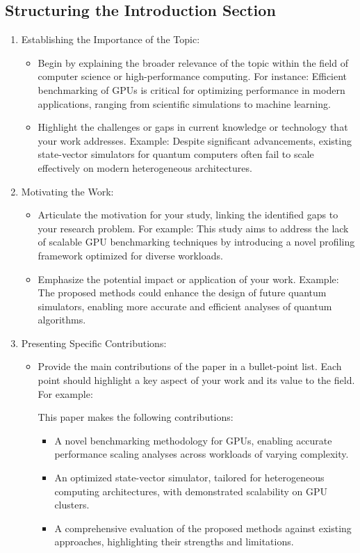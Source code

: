 \documentclass[conference]{IEEEtran}
\begin{document}
\subsection{Structuring the Introduction Section}
\begin{enumerate}
\item Establishing the Importance of the Topic:  
\begin{itemize}
   \item Begin by explaining the broader relevance of the topic within the field of computer science or high-performance computing. For instance: Efficient benchmarking of GPUs is critical for optimizing performance in modern applications, ranging from scientific simulations to machine learning.  
   \item Highlight the challenges or gaps in current knowledge or technology that your work addresses. Example: Despite significant advancements, existing state-vector simulators for quantum computers often fail to scale effectively on modern heterogeneous architectures.
\end{itemize}
\item Motivating the Work:  
\begin{itemize}
   \item Articulate the motivation for your study, linking the identified gaps to your research problem. For example: This study aims to address the lack of scalable GPU benchmarking techniques by introducing a novel profiling framework optimized for diverse workloads.  
   \item Emphasize the potential impact or application of your work. Example: The proposed methods could enhance the design of future quantum simulators, enabling more accurate and efficient analyses of quantum algorithms.  
\end{itemize}
\item Presenting Specific Contributions:  
\begin{itemize}
   \item Provide the main contributions of the paper in a bullet-point list. Each point should highlight a key aspect of your work and its value to the field. For example:  

     This paper makes the following contributions:
\begin{itemize}
     \item A novel benchmarking methodology for GPUs, enabling accurate performance scaling analyses across workloads of varying complexity.  
     \item An optimized state-vector simulator, tailored for heterogeneous computing architectures, with demonstrated scalability on GPU clusters.  
     \item A comprehensive evaluation of the proposed methods against existing approaches, highlighting their strengths and limitations.  
\end{itemize}
\end{itemize}
\end{enumerate}
\end{document}
